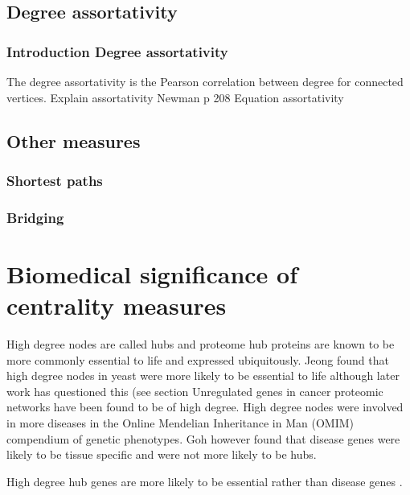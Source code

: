 \subsection{Degree assortativity}
\label{sec:degree assortativity}
\subsubsection{Introduction Degree assortativity}
The degree assortativity is the Pearson correlation between degree for connected vertices.\cite{noldus2015assortativity} Explain assortativity
Newman p 208
Equation assortativity


\subsection{Other measures}
\subsubsection{Shortest paths}


\subsubsection{Bridging}

\cite{valente2010bridging}



\section{Biomedical significance of centrality measures}

 High degree nodes are called hubs and proteome hub proteins are known to be more commonly essential to life \cite{jeong2001lethality} and expressed ubiquitously. \cite{goh2007human}  Jeong found that high degree nodes in yeast were more likely to be essential to life \cite{jeong2001lethality} although later work has questioned this (see section Unregulated genes in cancer proteomic networks have been found to be of high degree. \cite{wachi2005interactome}  High degree nodes were  involved in more diseases in the Online Mendelian Inheritance in Man (OMIM) compendium of genetic phenotypes. \cite{xu2006discovering}  Goh however found that disease genes were likely to be tissue specific and were not more likely to be hubs. \cite{goh2007human}  
 
High degree hub genes are more likely to be essential rather than disease genes \cite{barabasi2011network}. 


